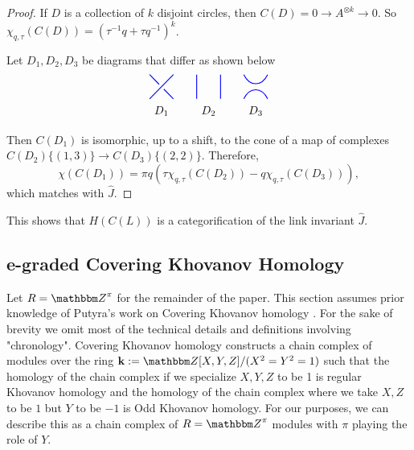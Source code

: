 \documentclass{amsart}
\newcommand{\hackcenter}[1]{
 \xy (0,0)*{#1}; \endxy}
\theoremstyle{plain}
\theoremstyle{definition}
\newtheorem{example}[theorem]{Example}
\theoremstyle{definition}
\numberwithin{equation}{section}
\numberwithin{theorem}{section}
\renewcommand{\to}{\rightarrow}
\numberwithin{equation}{section}
\let\hat=\widehat
\def\Z{{\mathbbm Z}}
\begin{document}
\begin{proof}
   If $D$ is a collection of $k$ disjoint circles, then $C(D)=0\to A^{\otimes k}\to 0$. So $\chi_{q,\tau}(C(D))=(\tau^{-1}q+\tau q^{-1})^k$.

   Let $D_1,D_2, D_3$ be diagrams that differ as shown below
\[
\hackcenter{ \begin{tikzpicture} [scale=.75]
\draw[thick,   blue] (0,0) to (1,1);
\draw[thick,   blue] (1,0) to (.6,.4);
\draw[thick,   blue] (0,1) to (.4,.6);
\node at (.5,-.5) {$D_1$};
\end{tikzpicture}}
\qquad
\hackcenter{ \begin{tikzpicture} [scale=.75]
\draw[thick,   blue] (0,0) to (0,1);
\draw[thick,   blue] (1,0) to (1,1);
\node at (.5,-.5) {$D_2$};
\end{tikzpicture}}
\qquad
\hackcenter{ \begin{tikzpicture} [scale=.75]
\draw[thick,   blue] (0,0).. controls ++(.25,.5) and ++(-.25,.5).. (1,0);
\draw[thick,   blue] (0,1).. controls ++(.25,-.5) and ++(-.25,-.5).. (1,1);
\node at (.5,-.5) {$D_3$};
\end{tikzpicture}}
\]

Then $C(D_1)$ is isomorphic, up to a shift, to the cone of a map of complexes $C(D_2)\{(1,3)\}\to C(D_3)\{(2,2)\}$.
Therefore, \[\chi(C(D_1))=\pi q ( \tau \chi_{q,\tau}(C(D_2))- q \chi_{q,\tau}(C(D_3))),\] which matches with $\hat{J}$.
\end{proof}

This shows that $H(C(L))$ is a categorification of the link invariant $\hat{J}$.

\subsection{e-graded Covering Khovanov Homology}
Let $R=\Z^\pi$ for the remainder of the paper.
This section assumes prior knowledge of Putyra's work on Covering Khovanov homology \cite{P}.
For the sake of brevity we omit most of the technical details and definitions involving "chronology".
Covering Khovanov homology constructs a chain complex of modules over the ring $\mathbf{k}:=\Z[X,Y,Z]/(X^2=Y^2=1)$ such that the homology of the chain complex if we specialize $X,Y,Z$ to be 1 is regular Khovanov homology and the homology of the chain complex where we take $X, Z$ to be $1$ but $Y$ to be $-1$ is Odd Khovanov homology.
For our purposes, we can describe this as a chain complex of $R=\Z^\pi$ modules with $\pi$ playing the role of $Y$.
\end{document}
